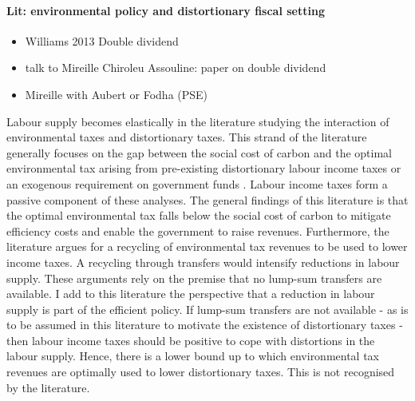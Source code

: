 \paragraph{Lit: environmental policy and distortionary fiscal setting}
\tr{}
\begin{itemize}
	\item Williams 2013 Double dividend 
	\item talk to Mireille Chiroleu Assouline: paper on double dividend
	\item Mireille with Aubert or Fodha (PSE)
\end{itemize}
Labour supply becomes elastically in the literature studying the interaction of environmental taxes and distortionary taxes.  This strand of the literature generally focuses on the gap between the social cost of carbon and the optimal environmental tax arising from pre-existing distortionary labour income taxes or an exogenous requirement on government funds \citep{Bovenberg1997EnvironmentalGrowth,  Kaplow2012OPTIMALTAXATION, Jacobs2019RedistributionCurves, Barrage2019OptimalPolicy}. Labour income taxes form a passive component of these analyses. 
The general findings of this literature is that the optimal environmental tax falls below the social cost of carbon to mitigate efficiency costs and enable the government to raise revenues. 
Furthermore, the literature argues for a recycling of environmental tax revenues to be used to lower income taxes. A recycling through transfers would intensify reductions in labour supply. These arguments rely on the premise that no lump-sum transfers are available. I add to this literature the perspective that a reduction in labour supply is part of the efficient policy. If lump-sum transfers are not available - as is to be assumed in this literature to motivate the existence of distortionary taxes - then labour income taxes should be positive to cope with distortions in the labour supply. Hence, there is a lower bound up to which environmental tax revenues are optimally used to lower distortionary taxes. This is not recognised by the literature. 

